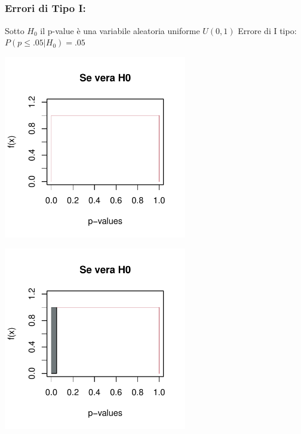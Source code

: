 \documentclass[xcolor={pdftex,dvipsnames,table}]{beamer}
\begin{document}
\subsection{}
\begin{frame}
\frametitle{Errori di Tipo I:}

\begin{overprint}
 {Sotto $H_0$ il p-value \`e una variabile aleatoria uniforme $U(0,1)$}
 {Errore di I tipo: $P(p\leq .05 |H_0)=.05$} %
\end{overprint} 
\begin{overprint} 
 \centerline{\includegraphics[width=8cm]{plaatjes/uniform1}}
 \centerline{\includegraphics[width=8cm]{plaatjes/uniform2}}
\end{overprint} 
\end{frame}
\end{document}
